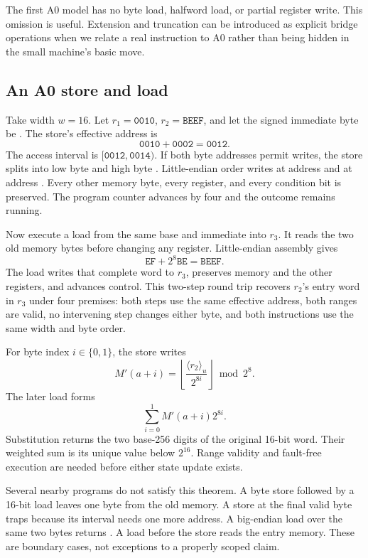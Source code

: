The first A0 model has no byte load, halfword load, or partial register write.
This omission is useful. Extension and truncation can be introduced as explicit
bridge operations when we relate a real instruction to A0 rather than being
hidden in the small machine's basic move.

\subsection{An A0 store and load}

Take width \(w=16\). Let \(r_1=\mathtt{0010}\),
\(r_2=\mathtt{BEEF}\), and let the signed immediate byte be . The
store's effective address is
\[
  \mathtt{0010}+\mathtt{0002}=\mathtt{0012}.
\]
The access interval is \([\mathtt{0012},\mathtt{0014})\). If both byte
addresses permit writes, the store splits  into low byte 
and high byte . Little-endian order writes  at address
 and  at address . Every other memory byte,
every register, and every condition bit is preserved. The program counter
advances by four and the outcome remains running.

Now execute a load from the same base and immediate into \(r_3\). It reads the
two old memory bytes before changing any register. Little-endian assembly gives
\[
  \mathtt{EF}+2^8\mathtt{BE}=\mathtt{BEEF}.
\]
The load writes that complete word to \(r_3\), preserves memory and the other
registers, and advances control. This two-step round trip recovers \(r_2\)'s
entry word in \(r_3\) under four premises: both steps use the same effective
address, both ranges are valid, no intervening step changes either byte, and
both instructions use the same width and byte order.

\begin{proofkit}[title={Store then load reconstructs one word}]
For byte index \(i\in\{0,1\}\), the store writes
\[
  M'(a+i)=\left\lfloor
  \frac{\langle r_2\rangle_u}{2^{8i}}
  \right\rfloor\bmod 2^8.
\]
The later load forms
\[
  \sum_{i=0}^{1} M'(a+i)2^{8i}.
\]
Substitution returns the two base-256 digits of the original 16-bit word.
Their weighted sum is its unique value below \(2^{16}\). Range validity and
fault-free execution are needed before either state update exists.
\end{proofkit}

Several nearby programs do not satisfy this theorem. A byte store followed by
a 16-bit load leaves one byte from the old memory. A store at the final valid
byte traps because its interval needs one more address. A big-endian load over
the same two bytes returns . A load before the store reads the entry
memory. These are boundary cases, not exceptions to a properly scoped claim.

